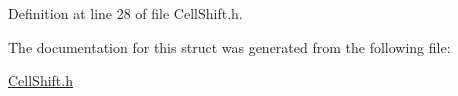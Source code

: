 Definition at line 28 of file Cell\+Shift.\+h.



The documentation for this struct was generated from the following file\+:\begin{DoxyCompactItemize}
\item 
\hyperlink{_cell_shift_8h}{Cell\+Shift.\+h}\end{DoxyCompactItemize}
